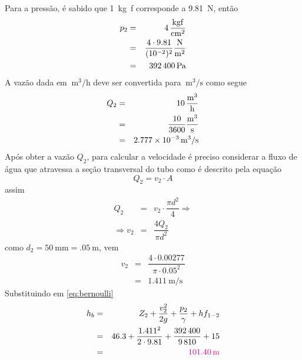 \documentclass[a4paper, 12pt, brazilian]{article}
\begin{document}
	Para a pressão, é sabido que \SI{1}{\kilogram f} corresponde a \SI{9.81}{\newton}, então
	\begin{eqnarray}
		p_{2}&=&\SI{4}{\dfrac{\kilogram f}{\centi\meter^{2}}}\\
			 &=&\dfrac{4\cdot 9.81}{(10^{-2})^{2}}\SI{}{\dfrac{\newton}{\meter^{2}}}\\
			 &=&\SI{392400}{\pascal}
	\end{eqnarray}
	A vazão dada em $\SI{}{\meter^{3}/\hour}$ deve ser convertida para $\SI{}{\meter^{3}/\second}$ como segue
	\begin{eqnarray}
		Q_{2}&=&\SI{10}{\dfrac{\meter^{3}}{\hour}}\\
			 &=&\dfrac{10}{3600}\SI{}{\dfrac{\meter^{3}}{\second}}\\
			 &=&\SI{2.777e-3}{\meter^{3}/\second}
	\end{eqnarray}
	Após obter a vazão $Q_{2}$, para calcular a velocidade é preciso considerar a fluxo de água que atravessa a seção transversal do tubo como é descrito pela equação
	\begin{equation}
		Q_{2}=v_{2}\cdot A
	\end{equation}
	assim
	\begin{eqnarray}
		Q_{2}&=&v_{2}\cdot\dfrac{\pi d^{2}}{4}\Rightarrow\\
		\Rightarrow	v_{2}&=&\dfrac{4Q_{2}}{\pi d^{2}}
	\end{eqnarray}
	como $d_{2}=\SI{50}{\milli\meter}=\SI{.05}{\meter}$, vem
	\begin{eqnarray}
		v_{2}&=&\dfrac{4\cdot 0.00277}{\pi\cdot 0.05^{2}}\\
			 &=&\SI{1.411}{\meter/\second}
	\end{eqnarray}
	Substituindo em \eqref{eq:bernoulli}
	\begin{eqnarray}
		h_{b}&=&Z_{2}+\dfrac{v_{2}^{2}}{2g}+\dfrac{p_{2}}{\gamma}+hf_{1-2}\\
			 &=&46.3+\dfrac{1.411^{2}}{2\cdot 9.81}+\dfrac{392\,400}{9\,810}+15\\
			 &=&\textcolor{magenta}{\SI{101.40}{\meter}}
	\end{eqnarray}
\end{document}
